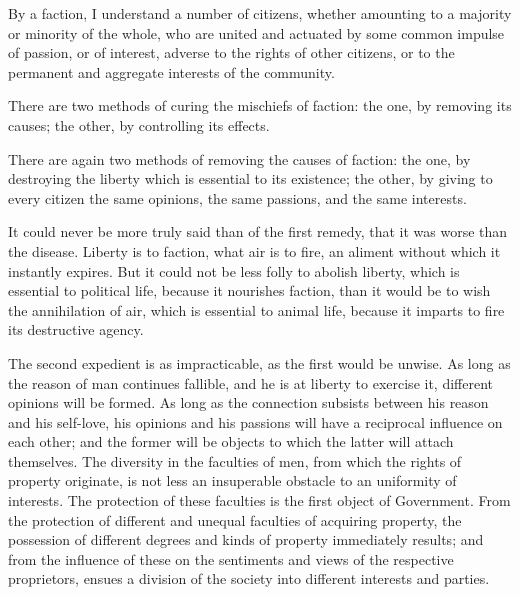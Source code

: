 By a faction, I understand a number of citizens, whether amounting to
a majority or minority of the whole, who are united and actuated by
some common impulse of passion, or of interest, adverse to the rights
of other citizens, or to the permanent and aggregate interests of the
community.

There are two methods of curing the mischiefs of faction: the one, by
removing its causes; the other, by controlling its effects.

There are again two methods of removing the causes of faction: the
one, by destroying the liberty which is essential to its existence;
the other, by giving to every citizen the same opinions, the same
passions, and the same interests.

It could never be more truly said than of the first remedy, that it
was worse than the disease. Liberty is to faction, what air is to
fire, an aliment without which it instantly expires. But it could not
be less folly to abolish liberty, which is essential to political
life, because it nourishes faction, than it would be to wish the
 annihilation of air, which is essential to animal life,
because it imparts to fire its destructive agency.

The second expedient is as impracticable, as the first would be
unwise. As long as the reason of man continues fallible, and he is at
liberty to exercise it, different opinions will be formed. As long as
the connection subsists between his reason and his self-love, his
opinions and his passions will have a reciprocal influence on each
other; and the former will be objects to which the latter will attach
themselves. The diversity in the faculties of men, from which the
rights of property originate, is not less an insuperable obstacle to
an uniformity of interests. The protection of these faculties is the
first object of Government. From the protection of different and
unequal faculties of acquiring property, the possession of different
degrees and kinds of property immediately results; and from the
influence of these on the sentiments and views of the respective
proprietors, ensues a division of the society into different interests
and parties.

